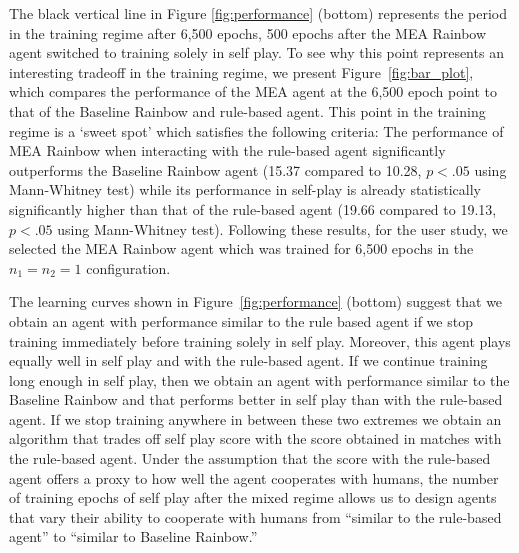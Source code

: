 \documentclass[letterpaper]{article} %
\begin{document}
The black vertical line in Figure \ref{fig:performance} (bottom) represents the period in the training regime  after 6,500 epochs, 500 epochs after the MEA Rainbow agent switched to training solely in self play.
To see why this point represents an interesting tradeoff in the training regime, we present
 Figure~\ref{fig:bar_plot}, which  compares  the performance of the MEA agent at the 6,500 epoch point to that of the Baseline Rainbow and rule-based agent.
    This point in the training regime is a `sweet spot' which satisfies the following criteria: The performance of  MEA Rainbow when interacting with the rule-based agent significantly outperforms the Baseline Rainbow agent  (15.37 compared to 10.28, $p < .05$ using Mann-Whitney test)
    while its performance in self-play is already statistically significantly higher than that of the rule-based agent (19.66 compared to 19.13,  $p < .05$ using Mann-Whitney test).
    Following these results, for the user study, we selected the MEA Rainbow agent which was trained for 6,500 epochs in the $n_1=n_2=1$ configuration.

    The learning curves shown in Figure~\ref{fig:performance} (bottom) suggest that we obtain an agent with performance similar to the rule based agent if we stop training immediately before training solely in self play. Moreover, this agent plays equally well in self play and with the rule-based agent. If we continue training long enough in self play, then we obtain an agent with performance similar to the Baseline Rainbow and that performs better in self play than with the rule-based agent. If we stop training anywhere in between these two extremes we obtain an algorithm that trades off self play score with the score obtained in matches with the rule-based agent. %
    Under the assumption that the score with the rule-based agent offers a proxy to how well the agent cooperates with humans, the number of training epochs of self play after the mixed regime allows us to design agents that vary their ability to cooperate with humans from ``similar to the rule-based agent'' to ``similar to Baseline Rainbow.''
\end{document}
